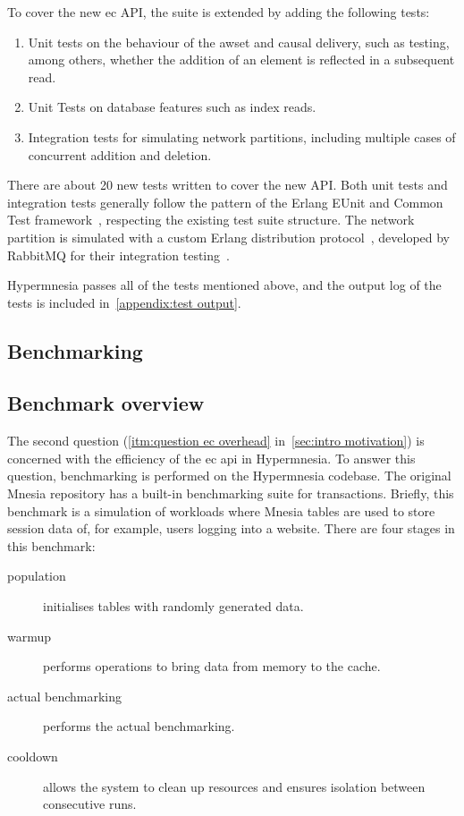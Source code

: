 To cover the new \acrshort{ec} API, the suite is extended by
adding the following tests:

\begin{enumerate}
  \item Unit tests on the behaviour of the \acrshort{awset}
  and causal delivery, such as testing, among others, whether the addition of an 
  element is reflected in a subsequent read.
  \item Unit Tests on database features such as index reads.
  \item Integration tests for simulating network partitions, including multiple 
  cases of concurrent addition and deletion.
\end{enumerate}

There are about 20 new tests written to cover the new API. 
Both unit tests and integration tests generally follow the pattern of the Erlang
EUnit and Common Test framework~\cite{ericssonab2023eunit,ericssonab2023ct},
respecting the existing test suite structure. The network partition is simulated with
a custom Erlang distribution protocol~\cite{ericssonab2023erldistro}, 
developed by RabbitMQ for their integration testing~\cite{rabbitmq2022inet_tcp_proxy}.

Hypermnesia passes all of the tests mentioned above, and the output
log of the tests is included in~\cref{appendix:test output}.

\subsection{Benchmarking} \label{sec:eval benchmarks}

\subsection{Benchmark overview}

The second question (\cref{itm:question ec overhead} in~\cref{sec:intro motivation}) 
is concerned with the efficiency of the \acrlong{ec} \acrshort{api} in Hypermnesia. 
To answer this question, benchmarking is performed on the Hypermnesia codebase.
The original Mnesia repository has a built-in benchmarking suite for transactions. 
Briefly, this benchmark is a
simulation of workloads where Mnesia tables are used to store session data of,
for example, users logging into a website. There are four stages in this benchmark:

\begin{description}
  \item[population] initialises tables with randomly generated data.
  \item[warmup] performs operations to bring data from memory to the cache.
  \item[actual benchmarking] performs the actual benchmarking.
  \item[cooldown] allows the system to clean up resources and ensures isolation
  between consecutive runs.
\end{description}

